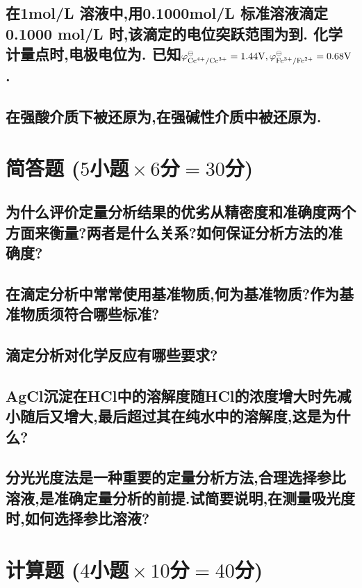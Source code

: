 \documentclass[UTF8]{article}
\newcommand{\ptsMulti}[3]{ \small($#1\!\!$小题$\!\!\times #2\!\!$分$\!\!=\!\!#3\!\!$分)}
\newcommand{\shortline}{\underline{\hspace{1cm}}}
\newcommand{\longline}{\underline{\hspace{2cm}}}
\begin{document}
    \subsection{在1mol/L 溶液中,用0.1000mol/L 标准溶液滴定0.1000 mol/L 时,该滴定的电位突跃范围为\shortline 到\shortline. 化学计量点时,电极电位为\shortline. 已知$\varphi^\ominus_{\ce{Ce^{4+}/Ce^{3+}}}=1.44\ce{V}, \varphi^\ominus_{\ce{Fe^{3+}/Fe^{2+}}}=0.68\ce{V}$.}
    
    \subsection{在强酸介质下被还原为\longline,在强碱性介质中被还原为\longline.}
    \section{简答题\ptsMulti{5}{6}{30}}

    \subsection{为什么评价定量分析结果的优劣从精密度和准确度两个方面来衡量?两者是什么关系?如何保证分析方法的准确度?}
    
    \subsection{在滴定分析中常常使用基准物质,何为基准物质?作为基准物质须符合哪些标准?}
    
    \subsection{滴定分析对化学反应有哪些要求?}
    
    \subsection{AgCl沉淀在HCl中的溶解度随HCl的浓度增大时先减小随后又增大,最后超过其在纯水中的溶解度,这是为什么?}
    
    \subsection{分光光度法是一种重要的定量分析方法,合理选择参比溶液,是准确定量分析的前提.试简要说明,在测量吸光度时,如何选择参比溶液?}

    \section{计算题\ptsMulti{4}{10}{40}}
\end{document}
